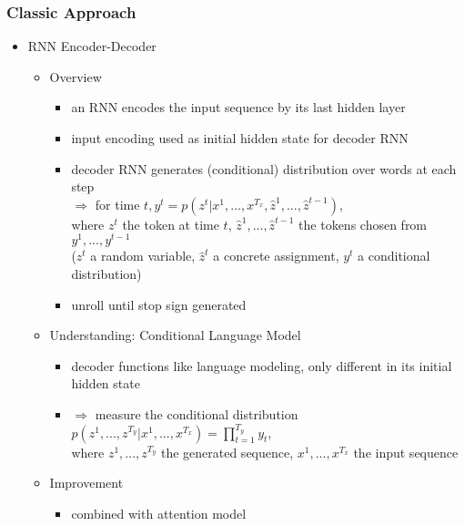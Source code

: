 \subsubsection{Classic Approach}
\begin{itemize}
\item RNN Encoder-Decoder
	\begin{itemize}
	\item Overview
		\begin{itemize}
		\item an RNN encodes the input sequence by its last hidden layer
		\item input encoding used as initial hidden state for decoder RNN
		\item decoder RNN generates (conditional) distribution over words at each step \\
		$\Rightarrow$ for time $t, y^t = p(z^t|x^1,...,x^{T_x}, \hat{z}^1,...,\hat{z}^{t-1})$, \\
		where $z^t$ the token at time $t$, $\hat{z}^1,...,\hat{z}^{t-1}$ the tokens chosen from $y^1,...,y^{t-1}$ \\
		($z^t$ a random variable, $\hat{z}^t$ a concrete assignment, $y^t$ a conditional distribution)
		\item unroll until stop sign generated
		\end{itemize}
	\item Understanding: Conditional Language Model
		\begin{itemize}
		\item decoder functions like language modeling, only different in its initial hidden state
		\item $\Rightarrow$ measure the conditional distribution $\displaystyle p(z^1,...,z^{T_y}|x^1,...,x^{T_x})=\prod_{t=1}^{T_y}y_t$, \\
		where $z^1,...,z^{T_y}$ the generated sequence, $x^1,...,x^{T_x}$ the input sequence
		\end{itemize}
	\item Improvement
		\begin{itemize}
		\item combined with attention model
		\end{itemize}
	\end{itemize}
\end{itemize}

